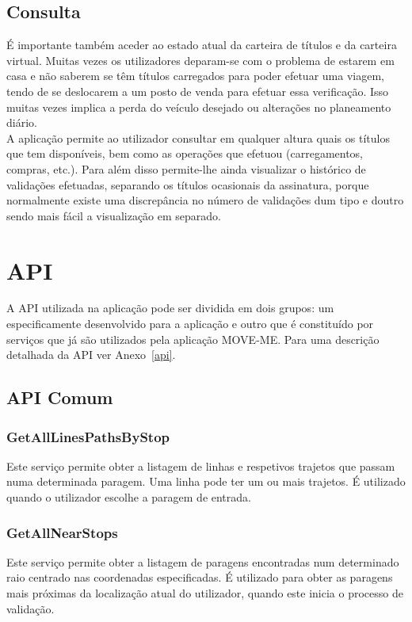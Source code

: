 \subsection{Consulta}

É importante também aceder ao estado atual da carteira de títulos e da carteira virtual. Muitas vezes os utilizadores deparam-se com o problema de estarem em casa e não saberem se têm títulos carregados para poder efetuar uma viagem, tendo de se deslocarem a um posto de venda para efetuar essa verificação. Isso muitas vezes implica a perda do veículo desejado ou alterações no planeamento diário.
\\A aplicação permite ao utilizador consultar em qualquer altura quais os títulos que tem disponíveis, bem como as operações que efetuou (carregamentos, compras, etc.). Para além disso permite-lhe ainda visualizar o histórico de validações efetuadas, separando os títulos ocasionais da assinatura, porque normalmente existe uma discrepância no número de validações dum tipo e doutro sendo mais fácil a visualização em separado.

\section{API}

A API utilizada na aplicação pode ser dividida em dois grupos: um especificamente desenvolvido para a aplicação e outro que é constituído por serviços que já são utilizados pela aplicação MOVE-ME. Para uma descrição detalhada da API ver Anexo~\ref{api}.

\subsection{API Comum}

\subsubsection{GetAllLinesPathsByStop}

Este serviço permite obter a listagem de linhas e respetivos trajetos que passam numa determinada paragem. Uma linha pode ter um ou mais trajetos. É utilizado quando o utilizador escolhe a paragem de entrada.

\subsubsection{GetAllNearStops}

Este serviço permite obter a listagem de paragens encontradas num determinado raio centrado nas coordenadas especificadas. É utilizado para obter as paragens mais próximas da localização atual do utilizador, quando este inicia o processo de validação.

